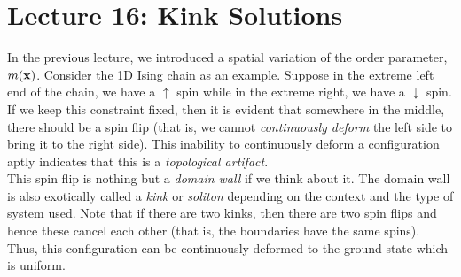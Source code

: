 \section*{Lecture 16: Kink Solutions}
In the previous lecture, we introduced a spatial variation of the order parameter, $m(\vb{x})$. Consider the 1D Ising chain as an example. Suppose in the extreme left end of the chain, we have a $\uparrow$ spin while in the extreme right, we have a $\downarrow$ spin.\\[0.2cm] If we keep this constraint fixed, then it is evident that somewhere in the middle, there should be a spin flip (that is, we cannot \textit{continuously deform} the left side to bring it to the right side). This inability to continuously deform a configuration aptly indicates that this is a \textit{topological artifact}. \\[0.2cm]
This spin flip is nothing but a \textit{domain wall} if we think about it. The domain wall is also exotically called a \textit{kink} or \textit{soliton} depending on the context and the type of system used. Note that if there are two kinks, then there are two spin flips and hence these cancel each other (that is, the boundaries have the same spins). Thus, this configuration can be continuously deformed to the ground state which is uniform. 

